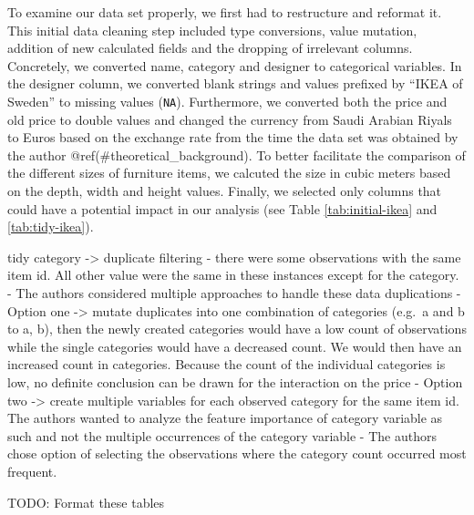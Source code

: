 \documentclass[a4paper, nobind]{templates/ociamthesis}
\begin{document}
To examine our data set properly, we first had to restructure and reformat it. This initial data cleaning step included type conversions, value mutation, addition of new calculated fields and the dropping of irrelevant columns.
Concretely, we converted name, category and designer to categorical variables. In the designer column, we converted blank strings and values prefixed by ``IKEA of Sweden'' to missing values (\texttt{NA}). Furthermore, we converted both the price and old price to double values and changed the currency from Saudi Arabian Riyals to Euros based on the exchange rate from the time the data set was obtained by the author @ref(\#theoretical\_background). To better facilitate the comparison of the different sizes of furniture items, we calcuted the size in cubic meters based on the depth, width and height values.
Finally, we selected only columns that could have a potential impact in our analysis (see Table \ref{tab:initial-ikea} and \ref{tab:tidy-ikea}).

tidy category -\textgreater{} duplicate filtering
- there were some observations with the same item id. All other value were the same in these instances except for the category.
- The authors considered multiple approaches to handle these data duplications
- Option one -\textgreater{} mutate duplicates into one combination of categories (e.g.~a and b to a, b), then the newly created categories would have a low count of observations while the single categories would have a decreased count. We would then have an increased count in categories. Because the count of the individual categories is low, no definite conclusion can be drawn for the interaction on the price
- Option two -\textgreater{} create multiple variables for each observed category for the same item id. The authors wanted to analyze the feature importance of category variable as such and not the multiple occurrences of the category variable
- The authors chose option of selecting the observations where the category count occurred most frequent.

TODO: Format these tables
\end{document}
